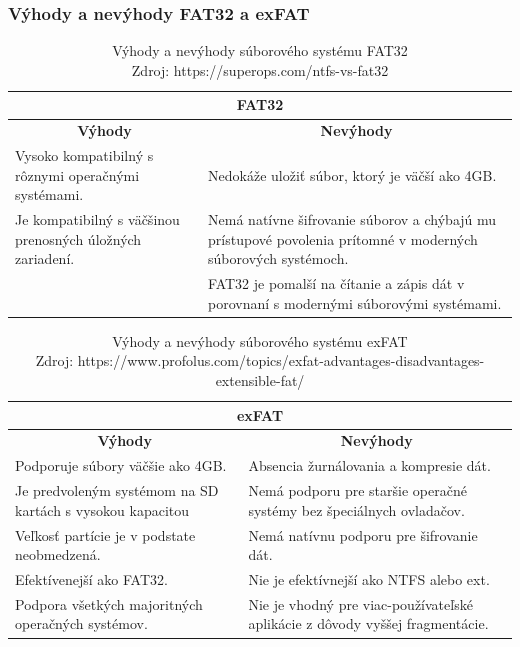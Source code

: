\documentclass[12pt,oneside,slovak,a4paper]{article}
\begin{document}
\subsubsection{Výhody a nevýhody FAT32 a exFAT}

\begin{table}[H]
\begin{tabularx}{\textwidth}{|X|X|}
\hline
\multicolumn{2}{|c|}{\textbf{FAT32}} \\ \hline
\multicolumn{1}{|c|}{\textbf{Výhody}} & \multicolumn{1}{c|}{\textbf{Nevýhody}} \\ \hline
Vysoko kompatibilný s rôznymi operačnými systémami. & Nedokáže uložiť súbor, ktorý je väčší ako 4GB. \\ \hline
Je kompatibilný s väčšinou prenosných úložných zariadení. & Nemá natívne šifrovanie súborov a chýbajú mu prístupové povolenia prítomné v moderných súborových systémoch. \\ \hline
& FAT32 je pomalší na čítanie a zápis dát v porovnaní s modernými súborovými systémami. \\ \hline
\end{tabularx}
\centering
\captionsetup{justification=centering,margin=2cm}
\caption{Výhody a nevýhody súborového systému FAT32 \\ Zdroj: https://superops.com/ntfs-vs-fat32}
\end{table}

\begin{table}[H]
\begin{tabularx}{\textwidth}{|X|X|}
\hline
\multicolumn{2}{|c|}{\textbf{exFAT}} \\ \hline
\multicolumn{1}{|c|}{\textbf{Výhody}} & \multicolumn{1}{c|}{\textbf{Nevýhody}} \\ \hline
Podporuje súbory väčšie ako 4GB. & Absencia žurnálovania a kompresie dát. \\ \hline
Je predvoleným systémom na SD kartách s vysokou kapacitou & Nemá podporu pre staršie operačné systémy bez špeciálnych ovladačov. \\ \hline
Veľkosť partície je v podstate neobmedzená. & Nemá natívnu podporu pre šifrovanie dát. \\ \hline
Efektívenejší ako FAT32. & Nie je efektívnejší ako NTFS alebo ext. \\ \hline
Podpora všetkých majoritných operačných systémov. & Nie je vhodný pre viac-používateľské aplikácie z dôvody vyššej fragmentácie. \\ \hline
\end{tabularx}
\centering
\captionsetup{justification=centering,margin=2cm}
\caption{Výhody a nevýhody súborového systému exFAT \\ Zdroj: https://www.profolus.com/topics/exfat-advantages-disadvantages-extensible-fat/}
\end{table}
\end{document}
